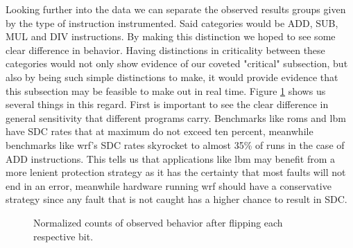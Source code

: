 \documentclass[lettersize,journal]{IEEEtran}
\begin{document}
Looking further into the data we can separate the observed results groups given by the type of instruction instrumented. Said categories would be ADD, SUB, MUL and DIV instructions. By making this distinction we hoped to see some clear difference in behavior. Having distinctions in criticality between these categories would not only show evidence of our coveted "critical" subsection, but also by being such simple distinctions to make, it would provide evidence that this subsection may be feasible to make out in real time. Figure \ref{categories} shows us several things in this regard. First is important to see the clear difference in general sensitivity that different programs carry. Benchmarks like roms and lbm have SDC rates that at maximum do not exceed ten percent, meanwhile benchmarks like wrf's SDC rates skyrocket to almost 35\% of runs in the case of ADD instructions. This tells us that applications like lbm may benefit from a more lenient protection strategy as it has the certainty that most faults will not end in an error, meanwhile hardware running wrf should have a conservative strategy since any fault that is not caught has a higher chance to result in SDC.\\
\begin{figure}[!t] 
    \centering
    \hspace{0mm}
\caption{Normalized counts of observed behavior after flipping each respective bit.}
\label{categories}
\end{figure}
\end{document}
